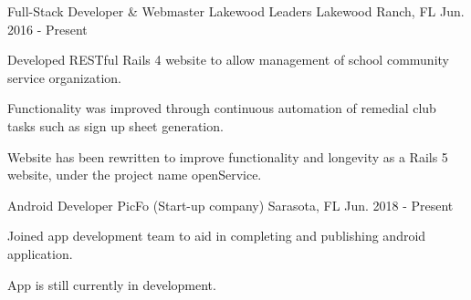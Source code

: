 \begin{cventries}
  \cventry
    {Full-Stack Developer \& Webmaster}
    {Lakewood Leaders}
    {Lakewood Ranch, FL}
    {Jun. 2016 - Present}
    {
      \begin{cvitems}
        \item {Developed RESTful Rails 4 website to allow management of school community service organization.}
        \item {Functionality was improved through continuous automation of remedial club tasks such as sign up sheet generation.}
        \item {Website has been rewritten to improve functionality and longevity as a Rails 5 website, under the project name openService.}
      \end{cvitems}
    }
  \cventry
    {Android Developer}
    {PicFo (Start-up company)}
    {Sarasota, FL}
    {Jun. 2018 - Present}
    {
      \begin{cvitems}
        \item {Joined app development team to aid in completing and publishing android application.}
        \item {App is still currently in development.}
      \end{cvitems}
    }
\end{cventries}
